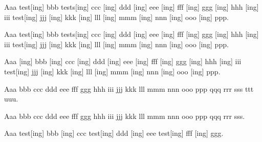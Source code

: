 \documentclass{article}
\begin{document}
Aaa \gls{test}[ing] bbb \glspl{test}[ing] ccc [ing] ddd
[ing] eee [ing] fff [ing]
ggg [ing] hhh [ing] iii \glsdesc{test}[ing] jjj
[ing] kkk [ing] lll [ing] mmm
[ing] nnn [ing] ooo [ing] ppp.

Aaa \Gls{test}[ing] bbb \Glspl{test}[ing] ccc [ing] ddd
[ing] eee [ing] fff [ing]
ggg [ing] hhh [ing] iii \Glsdesc{test}[ing] jjj
[ing] kkk [ing] lll [ing] mmm
[ing] nnn [ing] ooo [ing] ppp.

Aaa [ing] bbb [ing] ccc [ing] ddd
[ing] eee [ing] fff [ing]
ggg [ing] hhh [ing] iii \GLSdesc{test}[ing] jjj
[ing] kkk [ing] lll [ing] mmm
[ing] nnn [ing] ooo [ing] ppp.



Aaa  bbb  ccc  ddd
 eee  fff 
ggg  hhh  iii 
jjj  kkk  lll
 mmm  nnn 
ooo  ppp  qqq 
rrr  sss  ttt
 uuu.

Aaa  bbb  ccc  ddd
 eee  fff 
ggg  hhh  iii 
jjj  kkk  lll
 mmm  nnn 
ooo  ppp  qqq 
rrr  sss.



Aaa \acrshort{test}[ing] bbb [ing] ccc \acrlong{test}[ing] ddd
[ing] eee \acrfull{test}[ing] fff [ing] ggg.
\end{document}
